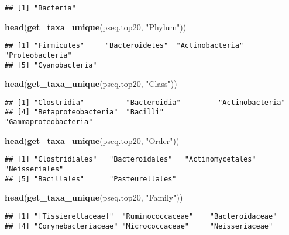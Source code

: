 \documentclass[]{article}
\newenvironment{Shaded}{\begin{snugshade}}{\end{snugshade}}
\newcommand{\KeywordTok}[1]{\textcolor[rgb]{0.13,0.29,0.53}{\textbf{#1}}}
\newcommand{\NormalTok}[1]{#1}
\newcommand{\StringTok}[1]{\textcolor[rgb]{0.31,0.60,0.02}{#1}}
\begin{document}
\begin{verbatim}
## [1] "Bacteria"
\end{verbatim}

\begin{Shaded}
\begin{Highlighting}[]
\KeywordTok{head}\NormalTok{(}\KeywordTok{get_taxa_unique}\NormalTok{(pseq.top20, }\StringTok{"Phylum"}\NormalTok{))}
\end{Highlighting}
\end{Shaded}

\begin{verbatim}
## [1] "Firmicutes"     "Bacteroidetes"  "Actinobacteria" "Proteobacteria"
## [5] "Cyanobacteria"
\end{verbatim}

\begin{Shaded}
\begin{Highlighting}[]
\KeywordTok{head}\NormalTok{(}\KeywordTok{get_taxa_unique}\NormalTok{(pseq.top20, }\StringTok{"Class"}\NormalTok{))}
\end{Highlighting}
\end{Shaded}

\begin{verbatim}
## [1] "Clostridia"          "Bacteroidia"         "Actinobacteria"     
## [4] "Betaproteobacteria"  "Bacilli"             "Gammaproteobacteria"
\end{verbatim}

\begin{Shaded}
\begin{Highlighting}[]
\KeywordTok{head}\NormalTok{(}\KeywordTok{get_taxa_unique}\NormalTok{(pseq.top20, }\StringTok{"Order"}\NormalTok{))}
\end{Highlighting}
\end{Shaded}

\begin{verbatim}
## [1] "Clostridiales"   "Bacteroidales"   "Actinomycetales" "Neisseriales"   
## [5] "Bacillales"      "Pasteurellales"
\end{verbatim}

\begin{Shaded}
\begin{Highlighting}[]
\KeywordTok{head}\NormalTok{(}\KeywordTok{get_taxa_unique}\NormalTok{(pseq.top20, }\StringTok{"Family"}\NormalTok{))}
\end{Highlighting}
\end{Shaded}

\begin{verbatim}
## [1] "[Tissierellaceae]"  "Ruminococcaceae"    "Bacteroidaceae"    
## [4] "Corynebacteriaceae" "Micrococcaceae"     "Neisseriaceae"
\end{verbatim}
\end{document}
